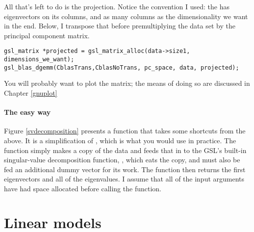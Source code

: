 All that's left to do is the projection. Notice the convention I used:
the  has eigenvectors on its columns, and as many columns as the
dimensionality we want in the end. Below, I transpose that before premultiplying
the data set by the principal component matrix.

\begin{lstlisting}
gsl_matrix *projected = gsl_matrix_alloc(data->size1, dimensions_we_want);
gsl_blas_dgemm(CblasTrans,CblasNoTrans, pc_space, data, projected);
\end{lstlisting}

You will probably want to plot the  matrix; the means
of doing so are discussed in Chapter \ref{gnuplot}

\paragraph{The easy way}

Figure \ref{svdecomposition} presents a function that takes some
shortcuts from the above. It is a
simplification of , which is what you would use in practice. The function simply makes
a copy of the data and feeds that in to the GSL's built-in singular-value
decomposition function, , which eats the copy, and must also be fed an
additional dummy vector for its work. The function then returns the first
 eigenvectors and all of the eigenvalues. I
assume that all of the input arguments have had space allocated before
calling the function.  





\section{Linear models}
\label{cat}

